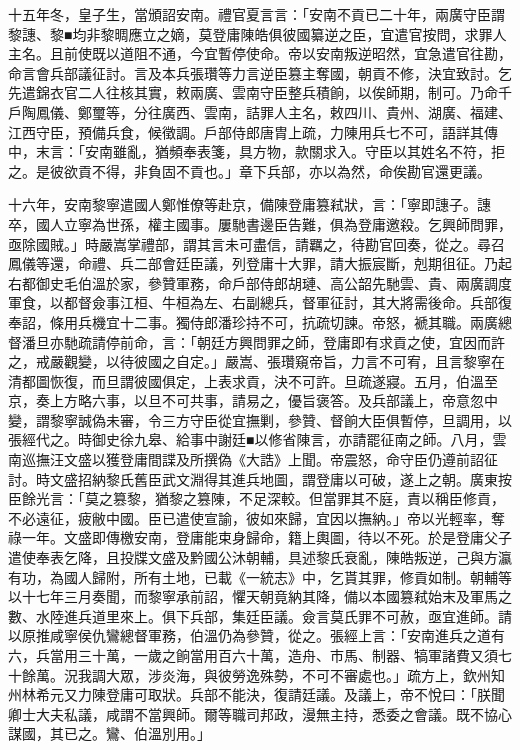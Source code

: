 \begin{pinyinscope}
十五年冬，皇子生，當頒詔安南。禮官夏言言：「安南不貢已二十年，兩廣守臣謂黎譓、黎■均非黎晭應立之嫡，莫登庸陳皓俱彼國纂逆之臣，宜遣官按問，求罪人主名。且前使既以道阻不通，今宜暫停使命。帝以安南叛逆昭然，宜急遣官往勘，命言會兵部議征討。言及本兵張瓚等力言逆臣篡主奪國，朝貢不修，決宜致討。乞先遣錦衣官二人往核其實，敕兩廣、雲南守臣整兵積餉，以俟師期，制可。乃命千戶陶鳳儀、鄭璽等，分往廣西、雲南，詰罪人主名，敕四川、貴州、湖廣、福建、江西守臣，預備兵食，候徵調。戶部侍郎唐胄上疏，力陳用兵七不可，語詳其傳中，末言：「安南雖亂，猶頻奉表箋，具方物，款關求入。守臣以其姓名不符，拒之。是彼欲貢不得，非負固不貢也。」章下兵部，亦以為然，命俟勘官還更議。

十六年，安南黎寧遣國人鄭惟僚等赴京，備陳登庸篡弒狀，言：「寧即譓子。譓卒，國人立寧為世孫，權主國事。屢馳書邊臣告難，俱為登庸邀殺。乞興師問罪，亟除國賊。」時嚴嵩掌禮部，謂其言未可盡信，請羈之，待勘官回奏，從之。尋召鳳儀等還，命禮、兵二部會廷臣議，列登庸十大罪，請大振宸斷，剋期徂征。乃起右都御史毛伯溫於家，參贊軍務，命戶部侍郎胡璉、高公韶先馳雲、貴、兩廣調度軍食，以都督僉事江桓、牛桓為左、右副總兵，督軍征討，其大將需後命。兵部復奉詔，條用兵機宜十二事。獨侍郎潘珍持不可，抗疏切諫。帝怒，褫其職。兩廣總督潘旦亦馳疏請停前命，言：「朝廷方興問罪之師，登庸即有求貢之使，宜因而許之，戒嚴觀變，以待彼國之自定。」嚴嵩、張瓚窺帝旨，力言不可宥，且言黎寧在清都圖恢復，而旦謂彼國俱定，上表求貢，決不可許。旦疏遂寢。五月，伯溫至京，奏上方略六事，以旦不可共事，請易之，優旨褒答。及兵部議上，帝意忽中變，謂黎寧誠偽未審，令三方守臣從宜撫剿，參贊、督餉大臣俱暫停，旦調用，以張經代之。時御史徐九皋、給事中謝廷■以修省陳言，亦請罷征南之師。八月，雲南巡撫汪文盛以獲登庸間諜及所撰偽《大誥》上聞。帝震怒，命守臣仍遵前詔征討。時文盛招納黎氏舊臣武文淵得其進兵地圖，謂登庸以可破，遂上之朝。廣東按臣餘光言：「莫之篡黎，猶黎之篡陳，不足深較。但當罪其不庭，責以稱臣修貢，不必遠征，疲敝中國。臣已遣使宣諭，彼如來歸，宜因以撫納。」帝以光輕率，奪祿一年。文盛即傳檄安南，登庸能束身歸命，籍上輿圖，待以不死。於是登庸父子遣使奉表乞降，且投牒文盛及黔國公沐朝輔，具述黎氏衰亂，陳皓叛逆，己與方瀛有功，為國人歸附，所有土地，已載《一統志》中，乞貰其罪，修貢如制。朝輔等以十七年三月奏聞，而黎寧承前詔，懼天朝竟納其降，備以本國篡弒始末及軍馬之數、水陸進兵道里來上。俱下兵部，集廷臣議。僉言莫氏罪不可赦，亟宜進師。請以原推咸寧侯仇鸞總督軍務，伯溫仍為參贊，從之。張經上言：「安南進兵之道有六，兵當用三十萬，一歲之餉當用百六十萬，造舟、市馬、制器、犒軍諸費又須七十餘萬。況我調大眾，涉炎海，與彼勞逸殊勢，不可不審處也。」疏方上，欽州知州林希元又力陳登庸可取狀。兵部不能決，復請廷議。及議上，帝不悅曰：「朕聞卿士大夫私議，咸謂不當興師。爾等職司邦政，漫無主持，悉委之會議。既不協心謀國，其已之。鸞、伯溫別用。」


\end{pinyinscope}
